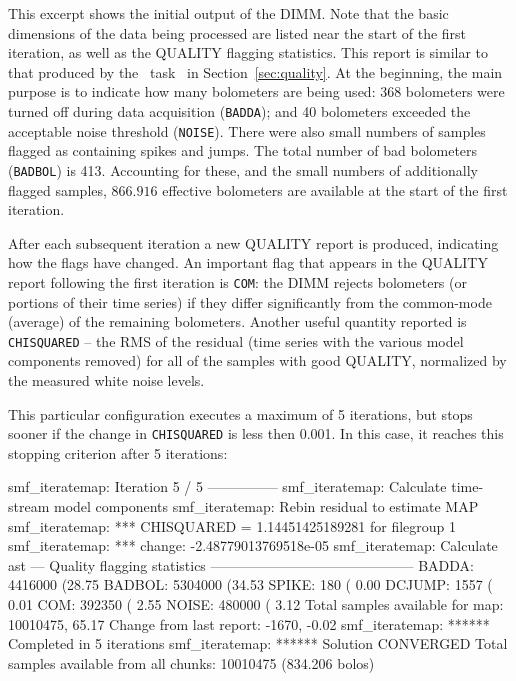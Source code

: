 \documentclass[twoside,11pt]{starlink}
\providecommand{\Kappa}{\xref{\textsc{Kappa}}{sun95}{}}
\providecommand{\task}[1]{\textsf{#1}}
\providecommand{\showqual}{\xref{\task{showqual}}{sun95}{SHOWQUAL}}
\begin{document}
\begin{small}
\begin{terminalv}
\end{terminalv}
\end{small}

This excerpt shows the initial output of the DIMM. Note that the basic
dimensions of the data being processed are listed near the start of
the first iteration, as well as the QUALITY flagging statistics. This
report is similar to that produced by the \Kappa\ task \showqual\ in
Section~\ref{sec:quality}. At the beginning, the main purpose is to
indicate how many bolometers are being used: 368 bolometers were
turned off during data acquisition (\texttt{BADDA}); and 40 bolometers
exceeded the acceptable noise threshold (\texttt{NOISE}). There were
also small numbers of samples flagged as containing spikes and
jumps. The total number of bad bolometers (\texttt{BADBOL}) is
413. Accounting for these, and the small numbers of additionally
flagged samples, $866.916$ effective bolometers are available at the
start of the first iteration.

After each subsequent iteration a new QUALITY report is produced,
indicating how the flags have changed. An important flag that appears
in the QUALITY report following the first iteration is \texttt{COM}:
the DIMM rejects bolometers (or portions of their time series) if they
differ significantly from the common-mode (average) of the remaining
bolometers. Another useful quantity reported is \texttt{CHISQUARED} --
the RMS of the residual (time series with the various model components
removed) for all of the samples with good QUALITY, normalized by the
measured white noise levels.

This particular configuration executes a maximum of 5 iterations, but
stops sooner if the change in \texttt{CHISQUARED} is less then
0.001. In this case, it reaches this stopping criterion after 5
iterations:

\begin{small}
\begin{terminalv}
smf_iteratemap: Iteration 5 / 5 ---------------
smf_iteratemap: Calculate time-stream model components
smf_iteratemap: Rebin residual to estimate MAP
smf_iteratemap: *** CHISQUARED = 1.14451425189281 for filegroup 1
smf_iteratemap: *** change: -2.48779013769518e-05
smf_iteratemap: Calculate ast
--- Quality flagging statistics --------------------------------------------
 BADDA:    4416000 (28.75%
BADBOL:    5304000 (34.53%
 SPIKE:        180 ( 0.00%
DCJUMP:       1557 ( 0.01%
   COM:     392350 ( 2.55%
 NOISE:     480000 ( 3.12%
Total samples available for map:   10010475, 65.17%
     Change from last report:      -1670, -0.02%
smf_iteratemap: ****** Completed in 5 iterations
smf_iteratemap: ****** Solution CONVERGED
Total samples available from all chunks: 10010475 (834.206 bolos)
\end{terminalv}
\end{small}
\end{document}
